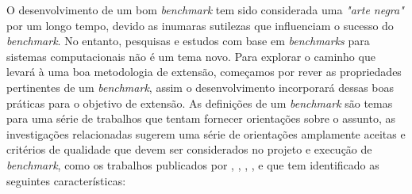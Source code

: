 O desenvolvimento de um bom \textit{benchmark} tem sido considerada uma \textit{"arte negra"} por um longo tempo, devido as inumaras sutilezas que influenciam o sucesso do \textit{benchmark}. 
No entanto, pesquisas e estudos com base em \textit{benchmarks} para sistemas computacionais não é um tema novo. Para explorar o caminho que levará à uma boa metodologia de extensão, começamos por rever as propriedades pertinentes de um \textit{benchmark}, assim o desenvolvimento incorporará dessas boas práticas para o objetivo de extensão.
As definições de um \textit{benchmark} são temas para uma série de trabalhos que tentam fornecer orientações sobre o assunto, as investigações relacionadas sugerem uma série de orientações amplamente aceitas e critérios de qualidade que devem ser considerados no projeto e execução de \textit{benchmark}, como os trabalhos publicados por , , , ,  e  que tem identificado as seguintes características:


